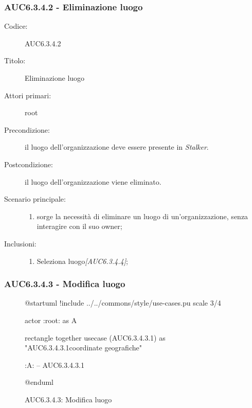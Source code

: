 \documentclass[casi-duso]{subfiles}
\begin{document}
\subsubsection{AUC6.3.4.2 - Eliminazione luogo}%
\label{subsub:AUC6.3.4.2}
\begin{description}
  \item[Codice:] AUC6.3.4.2
  \item[Titolo:] Eliminazione luogo
  \item[Attori primari:] root
  \item[Precondizione:] il luogo dell'organizzazione deve essere presente in \emph{Stalker}.
  \item[Postcondizione:] il luogo dell'organizzazione viene eliminato.
  \item[Scenario principale:]
  \begin{enumerate}
    \item sorge la necessità di eliminare un luogo di un'organizzazione, senza interagire con il suo owner;
  \end{enumerate}
  \item[Inclusioni:]
  \begin{enumerate}
    \item Seleziona luogo\emph{[AUC6.3.4.4]};
  \end{enumerate}
\end{description}

\subsubsection{AUC6.3.4.3 - Modifica luogo}%
\label{subsub:AUC6.3.4.3}

\begin{figure}[h!] 
  \centering 
  \begin{plantuml}
  @startuml 
  !include ../../commons/style/use-cases.pu
  scale 3/4

  actor :root: as A

  rectangle {
    together {
      usecase (AUC6.3.4.3.1) as "AUC6.3.4.3.1\nModifica coordinate geografiche"
    }
  }

  :A: -- AUC6.3.4.3.1

  @enduml
  \end{plantuml} 
  \caption{AUC6.3.4.3: Modifica luogo} 
  \label{fig:auc6_3_4_3} 
\end{figure}
\end{document}
